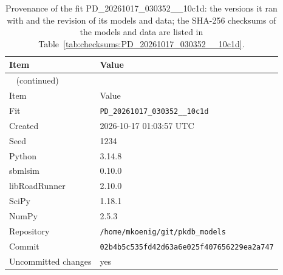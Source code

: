 \begin{longtable}{ll}
\caption{Provenance of the fit PD\_20261017\_030352\_\_10c1d: the versions it ran with and the revision of its models and data; the SHA-256 checksums of the models and data are listed in Table~\ref{tab:checksums:PD_20261017_030352__10c1d}.}\label{tab:provenance:PD_20261017_030352__10c1d} \\
\toprule
Item & Value \\
\midrule
\endfirsthead
\multicolumn{2}{l}{\small\tablename~\thetable{} (continued)} \\
\toprule
Item & Value \\
\midrule
\endhead
\bottomrule
\endlastfoot
Fit & \texttt{PD\_20261017\_030352\_\_10c1d} \\
Created & 2026-10-17 01:03:57 UTC \\
Seed & 1234 \\
Python & 3.14.8 \\
sbmlsim & 0.10.0 \\
libRoadRunner & 2.10.0 \\
SciPy & 1.18.1 \\
NumPy & 2.5.3 \\
Repository & \texttt{/home/mkoenig/git/pkdb\_models} \\
Commit & \texttt{02b4b5c535fd42d63a6e025f407656229ea2a747} \\
Uncommitted changes & yes \\
\end{longtable}



